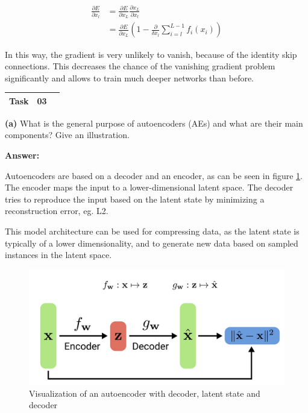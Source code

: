 \begin{align}
	\frac{\partial E}{\partial x_l} &= \frac{\partial E}{\partial x_L} \frac{\partial x_L}{\partial x_l} \\
	&= \frac{\partial E}{\partial x_L} \left( 1 - \frac{\partial}{\delta x_l} \sum_{i=l}^{L-1} f_i(x_i) \right)
\end{align}

In this way, the gradient is very unlikely to vanish, because of the identity skip connections. This decreases the chance of the vanishing gradient problem significantly and allows to train much deeper networks than before.

\begin{center}
	\begin{tabular}{|rlp{11cm}|}
		\hline
		\textbf{Task} & 03 & \\ \hline
	\end{tabular}
\end{center} 

\textbf{(a)} What is the general purpose of autoencoders (AEs) and what are their main components? Give an illustration.

\textbf{Answer:}

Autoencoders are based on a decoder and an encoder, as can be seen in figure \ref{img:ae}. The encoder maps the input to a lower-dimensional latent space. The decoder tries to reproduce the input based on the latent state by minimizing a reconstruction error, eg. L2.

This model architecture can be used for compressing data, as the latent state is typically of a lower dimensionality, and to generate new data based on sampled instances in the latent space.

\begin{figure}
	\centering
	\includegraphics[width=0.8\linewidth]{ae}
	\caption{Visualization of an autoencoder with decoder, latent state and decoder \cite[7 L. 11]{geiger20}}
	\label{img:ae}
\end{figure}

